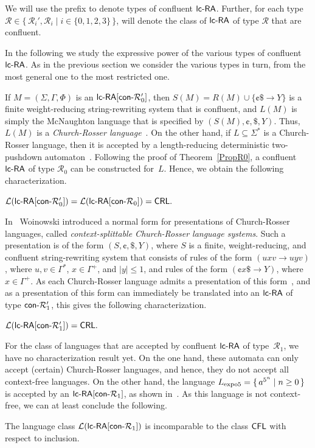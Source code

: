 We will use the prefix \index{$\conPrefix$}{$\conPrefix$} to denote types of confluent $\lcRA$. Further, for each type $\mathcal{R}\in\{\,\mathcal{R}_i',\mathcal{R}_i\mid i\in\{0,1,2,3\}\,\}$,  will denote the class of $\lcRA$ of type $\mathcal{R}$ that are confluent.

In the following we study the expressive power of the various types of confluent $\lcRA$. As in the previous section we consider the various types in turn, from the most general one to the most restricted one.

If $M=(\Sigma,\Gamma,\Phi)$ is an $\textup{\sf lc-RA$[\textup{\sf con-}\mathcal{R}_0']$}$, then $S(M) = R(M) \cup  \{\cent\$\to Y\}$ is a finite weight-reducing string-rewriting system that is confluent, and $L(M)$ is simply the McNaughton language that is specified by $(S(M),\cent,\$,Y)$. Thus, $L(M)$ is a \emph{Church-Rosser language}~\cite{MNO88}. On the other hand, if $L\subseteq\Sigma^*$ is a Church-Rosser language, then it is accepted by a length-reducing deterministic two-pushdown automaton~\cite{N2005}. Following the proof of Theorem~\ref{PropR0}, a confluent $\lcRA$ of type $\mathcal{R}_0$ can be constructed for~$L$. Hence, we obtain the following characterization.
%
\begin{theorem}\label{PropConR0}
${\mathcal L}(\textup{\sf lc-RA$[\textup{\sf con-}\mathcal{R}_0']$}) = {\mathcal L}(\textup{\sf lc-RA$[\textup{\sf con-}\mathcal{R}_0]$}) = \textup{\sf CRL}.$
\end{theorem}

In~\cite{Woi03} Woinowski introduced a normal form for presentations of Church-Rosser languages, called \emph{context-splittable Church-Rosser language systems}. Such a presentation is of the form $(S,\cent,\$,Y)$, where $S$ is a finite, weight-reducing, and confluent string-rewriting system that consists of rules of the form $(uxv\to uyv)$, where $u,v\in\Gamma^*$, $x\in\Gamma^+$, and $|y|\le 1$, and rules of the form $(\cent x\$\to Y)$, where $x\in\Gamma^+$. As each Church-Rosser language admits a presentation of this form~\cite{Woi03}, and as a presentation of this form can immediately be translated into an $\lcRA$ of type $\textup{\sf con-}\mathcal{R}_1'$, this gives the following characterization.

\begin{theorem}\label{PropConR1prim}
${\mathcal L}(\textup{\sf lc-RA$[\textup{\sf con-}\mathcal{R}_1']$}) = \textup{\sf CRL}.$
\end{theorem}

For the class of languages that are accepted by confluent $\lcRA$ of type~$\mathcal{R}_1$,
we have no characterization result yet. On the one hand, these automata can only accept (certain) Church-Rosser languages, and hence, they do not accept all context-free languages. On the other hand, the language  $L_{\rm expo5} = \{\,a^{5^n}\mid n\ge 0\,\}$ is accepted by an $\textup{\sf lc-RA$[\textup{\sf con-}\mathcal{R}_1]$}$, as shown in~\cite{OCM12}. As this language is not context-free, we can at least conclude the following.
%
\begin{corollary}\label{CorConR1}
The language class ${\mathcal L}(\textup{\sf lc-RA$[\textup{\sf con-}\mathcal{R}_1]$})$ is incomparable to the class $\textup{\sf CFL}$ with respect to inclusion.
\end{corollary}


